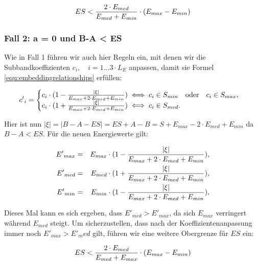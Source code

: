 	\begin{equation}
		ES < { 2 \cdot {E}_{med} \over {E}_{med} + {E}_{min} } \cdot ( {E}_{max} - {E}_{min} )
		\label{equ:embeddingstrengthconstraint_case1}
	\end{equation}

\subsubsection{Fall 2: a = 0 und B-A < ES}

Wie in Fall 1 führen wir auch hier Regeln ein, mit denen wir die Subbandkoeffizienten ${c}_{i},\quad i=1\dots{3\cdot{L}_{E}}$ anpassen, damit sie Formel \ref{equ:embeddingrelationships} erfüllen:

	 \begin{equation}
		 {c'}_{i} = \begin{cases}
    	 				{c}_{i} \cdot ( 1 - { |\xi| \over {{E}_{max} + 2\cdot {E}_{med} + {E}_{min}} }) \iff {c}_{i} \in {S}_{min} \quad\mbox{oder}\quad {c}_{i} \in {S}_{max}, 
						\\
    					{c}_{i} \cdot ( 1 + { |\xi| \over {{E}_{max} + 2\cdot {E}_{med} + {E}_{min}} }) \iff {c}_{i} \in {S}_{med}.
  				  	\end{cases}
		  \label{equ:modifcoef_case2}
	 \end{equation}
	 
Hier ist nun  $|\xi| = |B-A-ES| = ES+A-B = S + {E}_{max} - 2\cdot {E}_{med} + {E}_{min}$ da $B-A<ES$. Für die neuen Energiewerte gilt:

	 \begin{eqnarray*}
		 {E'}_{max} & = & {E}_{max} \cdot (1 - { |\xi| \over {{E}_{max} + 2\cdot {E}_{med} + {E}_{min}} }),
		 \\ 
		 {E'}_{med} & = & {E}_{med} \cdot (1 + { |\xi| \over {{E}_{max} + 2\cdot {E}_{med} + {E}_{min}} }),
		 \\
		 {E'}_{min} & = & {E}_{min} \cdot (1 - { |\xi| \over {{E}_{max} + 2\cdot {E}_{med} + {E}_{min}} }),
	\end{eqnarray*}
	
Dieses Mal kann es sich ergeben, dass ${E'}_{med} > {E'}_{max}$, da sich ${E}_{max}$ verringert während ${E}_{med}$ steigt. Um sicherzustellen, dass nach der Koeffizientenanpassung immer noch ${E'}_{max} > {E'}_med$ gilt, führen wir eine weitere Obergrenze für $ES$ ein:

	\begin{equation}
		ES < { 2 \cdot {E}_{med} \over {E}_{med} + {E}_{max} } \cdot ( {E}_{max} - {E}_{min} )
		\label{equ:embeddingstrengthconstraint_case2}
	\end{equation}

